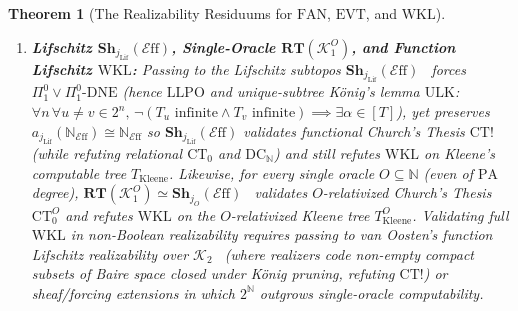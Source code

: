 \documentclass[10pt,twoside,openright]{book}
\theoremstyle{crmplain}
\newtheorem{theorem}{Theorem}[section]
\theoremstyle{crmdef}
\theoremstyle{crmremark}
\newcommand{\Eff}{\mathcal{E}\mathrm{ff}}
\begin{document}
\begin{theorem}[The Realizability Residuums for $\mathrm{FAN}$, $\mathrm{EVT}$, and $\mathrm{WKL}$]
\begin{enumerate}[label=(\arabic*),leftmargin=2em]
  \item \textbf{Lifschitz $\mathbf{Sh}_{j_{\mathrm{Lif}}}(\Eff)$, Single-Oracle $\mathbf{RT}(\mathcal{K}_1^O)$, and Function Lifschitz $\mathrm{WKL}$:} Passing to the Lifschitz subtopos $\mathbf{Sh}_{j_{\mathrm{Lif}}}(\Eff)$~\cite[\S 4.4]{vanOosten08} forces $\Pi^0_1 \lor \Pi^0_1\text{-}\mathrm{DNE}$ (hence $\mathrm{LLPO}$ and unique-subtree K\"onig's lemma $\mathrm{ULK}$: $\forall n\,\forall u \neq v \in 2^n,\, \neg(T_u\text{ infinite} \wedge T_v\text{ infinite}) \implies \exists \alpha \in [T]$), yet preserves $a_{j_{\mathrm{Lif}}}(\mathbb{N}_{\Eff}) \cong \mathbb{N}_{\Eff}$ so $\mathbf{Sh}_{j_{\mathrm{Lif}}}(\Eff)$ \emph{validates functional Church's Thesis $\mathrm{CT}!$} (while refuting relational $\mathrm{CT}_0$ and $\mathrm{DC}_{\mathbb{N}}$) and still \emph{refutes $\mathrm{WKL}$} on Kleene's computable tree $T_{\mathrm{Kleene}}$. Likewise, for \emph{every} single oracle $O \subseteq \mathbb{N}$ (even of $\mathrm{PA}$ degree), $\mathbf{RT}(\mathcal{K}_1^O) \simeq \mathbf{Sh}_{j_O}(\Eff)$~\cite{LeeVanOosten13} validates $O$-relativized Church's Thesis $\mathrm{CT}_0^O$ and refutes $\mathrm{WKL}$ on the $O$-relativized Kleene tree $T_{\mathrm{Kleene}}^O$. Validating full $\mathrm{WKL}$ in non-Boolean realizability requires passing to \emph{van Oosten's function Lifschitz realizability over $\mathcal{K}_2$}~\cite[\S 3]{vanOosten90} (where realizers code non-empty compact subsets of Baire space closed under K\"onig pruning, refuting $\mathrm{CT}!$) or sheaf/forcing extensions in which $2^{\mathbb{N}}$ outgrows single-oracle computability.

\end{enumerate}

\end{theorem}
\end{document}
